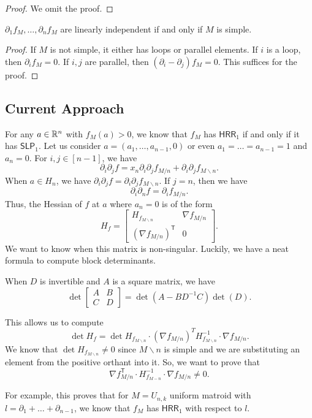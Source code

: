 \documentclass[12pt]{article}
\newcommand{\SLP}{\mathsf{SLP}}
\newcommand{\HRR}{\mathsf{HRR}}
\begin{document}
\begin{proof}
	We omit the proof. 
\end{proof}


\begin{prop}
	$\partial_1 f_M, \ldots, \partial_n f_M$ are linearly independent if and only if $M$ is simple.  
\end{prop}
\begin{proof}
	If $M$ is not simple, it either has loops or parallel elements. If $i$ is a loop, then $\partial_i f_M = 0$. If $i, j$ are parallel, then $(\partial_i - \partial_j) f_M = 0$. This suffices for the proof. 
\end{proof}

\subsection{Current Approach}

For any $a \in \mathbb{R}^n$ with $f_M(a) > 0$, we know that $f_M$ has $\HRR_1$ if and only if it has $\SLP_1$. Let us consider $a = (a_1, \ldots, a_{n-1}, 0)$ or even $a_1 = \ldots = a_{n-1} = 1$ and $a_n = 0$. For $i, j \in [n-1]$, we have 
\[
	\partial_i \partial_j f = x_n \partial_i \partial_j f_{M / n} + \partial_{i} \partial_j f_{M \backslash n}.
\]
When $a \in H_n$, we have $\partial_i \partial_j f = \partial_i \partial_j f_{M \backslash n}$.  If $j = n$, then we have 
\[
	\partial_i \partial_n f = \partial_i f_{M / n}.
\]
Thus, the Hessian of $f$ at $a$ where $a_n = 0$ is of the form 
\[
	H_f = \begin{bmatrix}
		H_{f_{M \backslash n}} & \nabla f_{M/n} \\
		\left ( \nabla f_{M/n} \right )^{\mathsf{T}} & 0
	\end{bmatrix}.
\]
We want to know when this matrix is non-singular. Luckily, we have a neat formula to compute block determinants. 

\begin{thm} 
	When $D$ is invertible and $A$ is a square matrix, we have
	\[
		\det \begin{bmatrix}
			A & B \\ C & D
		\end{bmatrix} = \det (A - BD^{-1}C) \det (D).
	\]
\end{thm}

This allows us to compute
\[
	\det H_f = \det H_{f_{M \backslash n}} \cdot (\nabla f_{M / n})^T H_{f_{M\backslash n}}^{-1} \cdot \nabla f_{M/n}. 
\]
We know that $\det H_{f_{M\backslash n}} \neq 0$ since $M \backslash n$ is simple and we are substituting an element from the positive orthant into it. So, we want to prove that 
\[
 	\nabla f_{M/n}^\mathsf{T} \cdot H_{f_{M - n}}^{-1} \cdot \nabla f_{M/n} \neq 0.
\]

For example, this proves that for $M = U_{n, k}$ uniform matroid with $l = \partial_1 + \ldots + \partial_{n-1}$, we know that $f_M$ has $\mathsf{HRR}_1$ with respect to $l$. 



\end{document}
